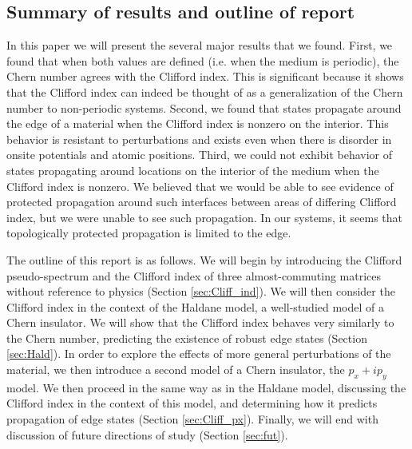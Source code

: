 \documentclass[a4paper]{article}
\newcommand{\aw}[1]{{\color{blue} [AW: #1]}}
\begin{document}

\subsection{Summary of results and outline of report}

In this paper we will present the several major results that we found. First, we found that when both values are defined (i.e. when the medium is periodic), the Chern number agrees with the Clifford index. This is significant because it shows that the Clifford index can indeed be thought of as a generalization of the Chern number to non-periodic systems. Second, we found that states propagate around the edge of a material when the Clifford index is nonzero on the interior. This behavior is resistant to perturbations and exists even when there is disorder in onsite potentials and atomic positions. Third, we could not exhibit behavior of states propagating around locations on the interior of the medium when the Clifford index is nonzero. We believed that we would be able to see evidence of protected propagation around such interfaces between areas of differing Clifford index, but we were unable to see such propagation. In our systems, it seems that topologically protected propagation is limited to the edge.

The outline of this report is as follows. We will begin by introducing the Clifford pseudo-spectrum and the Clifford index of three almost-commuting matrices without reference to physics (Section \ref{sec:Cliff_ind}). We will then consider the Clifford index in the context of the Haldane model, a well-studied model of a Chern insulator. We will show that the Clifford index behaves very similarly to the Chern number, predicting the existence of robust edge states (Section \ref{sec:Hald}). In order to explore the effects of more general perturbations of the material, we then introduce a second model of a Chern insulator, the $p_x + ip_y$ model. We then proceed in the same way as in the Haldane model, discussing the Clifford index in the context of this model, and determining how it predicts propagation of edge states (Section \ref{sec:Cliff_px}). Finally, we will end with discussion of future directions of study (Section \ref{sec:fut}).
\end{document}
